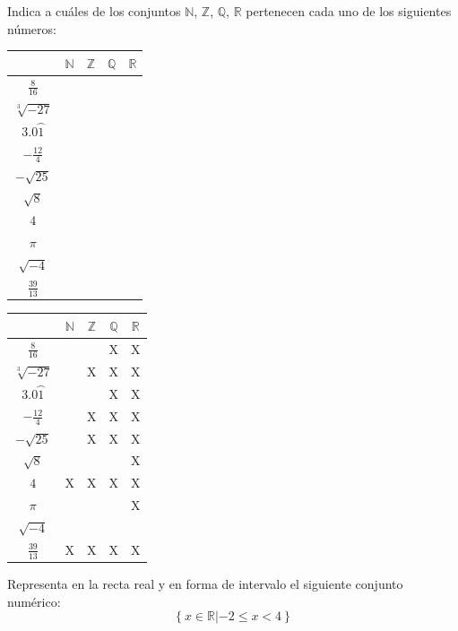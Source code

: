 \documentclass[addpoints,spanish, 12pt,a4paper]{exam}
\begin{document}
\begin{questions}

\question[2] Indica a cuáles de los conjuntos
$\mathbb{N}$, $\mathbb{Z}$, $\mathbb{Q}$, $\mathbb{R}$ pertenecen cada uno de los siguientes números:
\begin{center}
\begin{tabular}{|c |c |c |c |c|}\hline
&$\mathbb{N}$& $\mathbb{Z}$& $\mathbb{Q}$&$\mathbb{R}$\\ 
\hline
$\frac{8}{16}$&&&&\\
\hline
$\sqrt[3]{-27}$&&&&\\
\hline
$3.0\wideparen{1}$&&&&\\
\hline
$-\frac{12}{4}$&&&&\\
\hline
$-\sqrt{25}$&&&&\\
\hline
$\sqrt{8}$&&&&\\
\hline
$4$&&&&\\
\hline
$\pi$&&&&\\
\hline
$\sqrt{-4}$&&&&\\
\hline
$\frac{39}{13}$&&&&\\
\hline
\end{tabular}

\end{center}

\begin{solution}
\begin{tabular}{|c |c |c |c |c|}\hline
&$\mathbb{N}$& $\mathbb{Z}$& $\mathbb{Q}$&$\mathbb{R}$\\ 
\hline
$\frac{8}{16}$&&&X&X\\
\hline
$\sqrt[3]{-27}$&&X&X&X\\
\hline
$3.0\wideparen{1}$&&&X&X\\
\hline
$-\frac{12}{4}$&&X&X&X\\
\hline
$-\sqrt{25}$&&X&X&X\\
\hline
$\sqrt{8}$&&&&X\\
\hline
$4$&X&X&X&X\\
\hline
$\pi$&&&&X\\
\hline
$\sqrt{-4}$&&&&\\
\hline
$\frac{39}{13}$&X&X&X&X\\
\hline
\end{tabular}
\end{solution}
\addpoints

\question[1] Representa en la recta real y en forma de intervalo el siguiente conjunto numérico:
\addpoints %
$$\left\{ x \in \mathbb{R} \left| -2 \leqslant x < 4 \right. \right\}$$


\end{questions}
\end{document}
